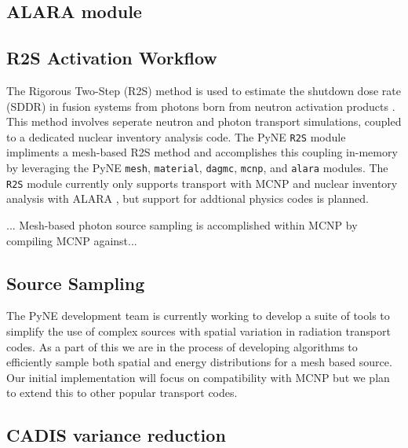 \documentclass{anstrans}
\begin{document}
\subsection{ALARA module}


\subsection{R2S Activation Workflow}

The Rigorous Two-Step (R2S) method is used to estimate the shutdown dose rate
(SDDR) in fusion systems from photons born from neutron activation products
\cite{chen_rigorous_2002}. This method involves seperate neutron and photon
transport simulations, coupled to a dedicated nuclear inventory analysis code.
The PyNE \texttt{R2S} module impliments a mesh-based R2S method and
accomplishes this coupling in-memory by leveraging the PyNE \texttt{mesh},
\texttt{material}, \texttt{dagmc}, \texttt{mcnp}, and \texttt{alara} modules.
The \texttt{R2S} module currently only supports transport with MCNP and nuclear
inventory analysis with ALARA \cite{wilson_validation_1998}, but support for
addtional physics codes is planned. 

... Mesh-based photon source sampling is accomplished within MCNP by compiling MCNP against...


\subsection{Source Sampling}

The PyNE development team is currently working to develop a suite of tools to 
simplify the use of complex sources with spatial variation in radiation transport
codes. As a part of this we are in the process of developing algorithms to efficiently
sample both spatial and energy distributions for a mesh based source. Our initial
implementation will focus on compatibility with MCNP but we plan to extend this to
other popular transport codes.

\subsection{CADIS variance reduction}
\end{document}
